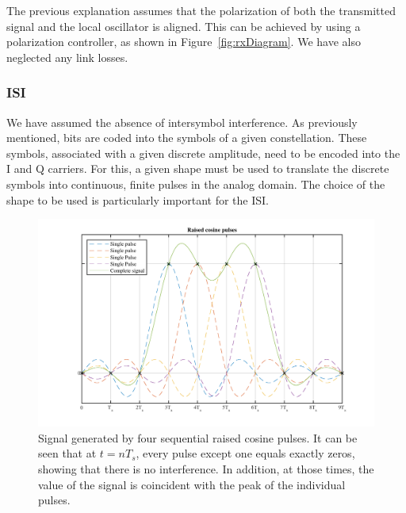 	The previous explanation assumes that the polarization of both the transmitted
	signal and the local oscillator is aligned. This can be achieved by using a
	polarization controller, as shown in Figure~\ref{fig:rxDiagram}. We have also
	neglected any link losses.

	\subsubsection{ISI}\label{sec:ISI}
	We have assumed the absence of intersymbol interference.
	As previously mentioned, bits are coded into the symbols of a given constellation.
	These symbols, associated with a given discrete amplitude, need to be
	encoded into the I and Q carriers. For this, a given shape must be used to
	translate the discrete symbols into continuous, finite pulses in the analog domain.
	The choice of the shape to be used is particularly important for the ISI.

	\begin{figure}[b]
		\centering
		\includegraphics[width=\textwidth]{./sdf/m_qam_system/figures/eyes/ISI/signalAndPulsesRaisedCosine.pdf}
		\caption{Signal generated by four sequential raised cosine pulses. It can be seen
		that at $t=nT_s$, every pulse except one equals exactly zeros, showing that
	there is no interference. In addition, at those times, the value of the signal
is coincident with the peak of the individual pulses.}
\label{fig:ISIRCsig}
	\end{figure}

